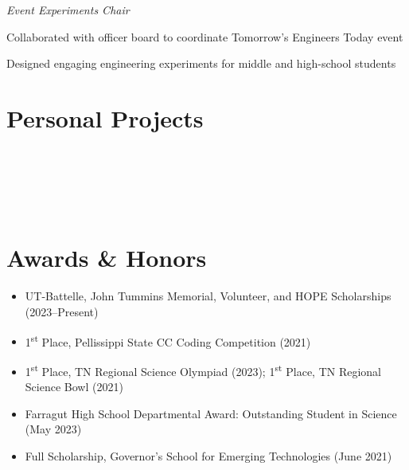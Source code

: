\documentclass[11pt,a4paper]{article}
\begin{document}
\textit{Event Experiments Chair} \vspace{-6pt}
\begin{itemize}[leftmargin=*, topsep=0pt, itemsep=1pt, partopsep=0pt, parsep=0pt]
  {\small
  \item Collaborated with officer board to coordinate Tomorrow's Engineers Today event
  \item Designed engaging engineering experiments for middle and high-school students
  }
\end{itemize}
\vspace{-5pt}

\section*{Personal Projects}

 \\
 \\
 \\
 \\
\vspace{-5pt}


\section*{Awards \& Honors}
\begin{itemize}[leftmargin=*, topsep=0pt, itemsep=2pt, parsep=0pt]
  \item UT-Battelle, John Tummins Memorial, Volunteer, and HOPE Scholarships (2023–Present)
  \item 1\textsuperscript{st} Place, Pellissippi State CC Coding Competition (2021)
  \item 1\textsuperscript{st} Place, TN Regional Science Olympiad (2023); 1\textsuperscript{st} Place, TN Regional Science Bowl (2021)
  \item Farragut High School Departmental Award: Outstanding Student in Science (May 2023)
  \item Full Scholarship, Governor’s School for Emerging Technologies (June 2021) 
\end{itemize}
\end{document}
